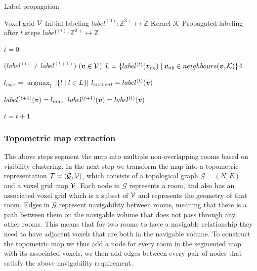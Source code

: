 \begin{algorithm}
    \caption{Label propagation}
    \begin{algorithmic}

    \Require \quad Voxel grid \(\mathcal{V}\)
    \Require \quad Initial labeling \(label^{(0)}: \mathbb{Z}^{3+} \mapsto \mathbb{Z}\)
    \Require \quad Kernel \(\mathcal{K}\)
    \Ensure \quad Propagated labeling after \(t\) steps \(label^{(t)}: \mathbb{Z}^{3+} \mapsto \mathbb{Z}\)

    \State $t=0$

    \While($label^{(t)} \neq label^{(t+1)}$) 
        \ForEach($\boldsymbol{v} \in \mathcal{V}$)
            \State $L = \{label^{(t)}(\boldsymbol{v}_{nb}) \mid \boldsymbol{v}_{nb} \in neighbours(\boldsymbol{v}, \mathcal{K})\}$4

            \State $l_{max} = \mathop{argmax}_{l} \ |\{l \mid l \in L\}|$ 
            \State $l_{current} = label^{(t)}(\boldsymbol{v})$  

                \State \(label^{(t+1)}(\boldsymbol{v}) = l_{max}\)
            \Else
                \State \(label^{(t+1)}(\boldsymbol{v}) = label^{(t)}(\boldsymbol{v})\)
            \EndIf
        \EndFor

        \State $t = t+1$ 
    \EndWhile
    \end{algorithmic}
\end{algorithm}

\subsubsection{Topometric map extraction}
The above steps segment the map into multiple non-overlapping rooms based on visibility clustering. In the next step we transform the map into a topometric representation \(\mathcal{T} = (\mathcal{G}, \mathcal{V})\), which consists of a topological graph \(\mathcal{G}=(N,E)\) and a voxel grid map \(\mathcal{V}\). Each node in \(\mathcal{G}\) represents a room, and also has an associated voxel grid which is a subset of \(\mathcal{V}\) and represents the geometry of that room. Edges in \(\mathcal{G}\) represent navigability between rooms, meaning that there is a path between them on the navigable volume that does not pass through any other rooms. This means that for two rooms to have a navigable relationship they need to have adjacent voxels that are both in the navigable volume. To construct the topometric map we thus add a node for every room in the segmented map with its associated voxels, we then add edges between every pair of nodes that satisfy the above navigability requirement.  


